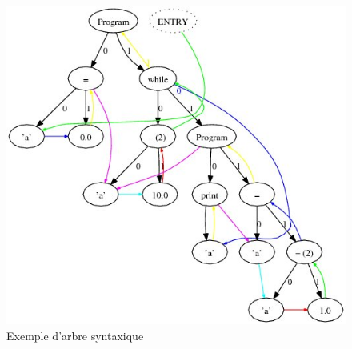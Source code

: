 \documentclass[a4paper,12pt]{article}
\begin{document}
			\begin{figure}[!h]
			
				\begin{center}
					\includegraphics[scale=0.6]{images/AST.jpg}
					\caption{Exemple d'arbre syntaxique}
				\end{center}
			
			\end{figure}


			
			
			
			
\end{document}
